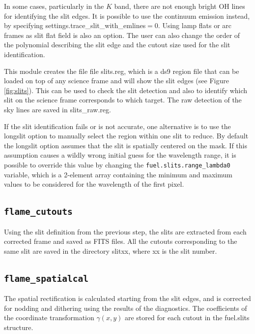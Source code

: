 \documentclass[a4paper]{article}
\begin{document}
In some cases, particularly in the $K$ band, there are not enough bright OH lines for identifying the slit edges. It is possible to use the continuum emission instead, by specifying settings.trace\_slit\_with\_emlines$ = 0$. Using lamp flats or arc frames as slit flat field is also an option. The user can also change the order of the polynomial describing the slit edge and the cutout size used for the slit identification.

This module creates the file file slits.reg, which is a ds9 region file that can be loaded on top of any science frame and will show the slit edges (see Figure \ref{fig:slits}). This can be used to check the slit detection and also to identify which slit on the science frame corresponds to which target. The raw detection of the sky lines are saved in slits\_raw.reg.

If the slit identification fails or is not accurate, one alternative is to use the longslit option to manually select the region within one slit to reduce. By default the longslit option assumes that the slit is spatially centered on the mask. If this assumption causes a wildly wrong initial guess for the wavelength range, it is possible to override this value by changing the \texttt{fuel.slits.range\_lambda0} variable, which is a 2-element array containing the minimum and maximum values to be considered for the wavelength of the first pixel.


\subsection{\texttt{flame\_cutouts}}

Using the slit definition from the previous step, the slits are extracted from each corrected frame and saved as FITS files. All the cutouts corresponding to the same slit are saved in the directory slitxx, where xx is the slit number.

\subsection{\texttt{flame\_spatialcal}}

The spatial rectification is calculated starting from the slit edges, and is corrected for nodding and dithering using the results of the diagnostics. The coefficients of the coordinate transformation $\gamma(x,y)$ are stored for each cutout in the fuel.slits structure.
\end{document}
